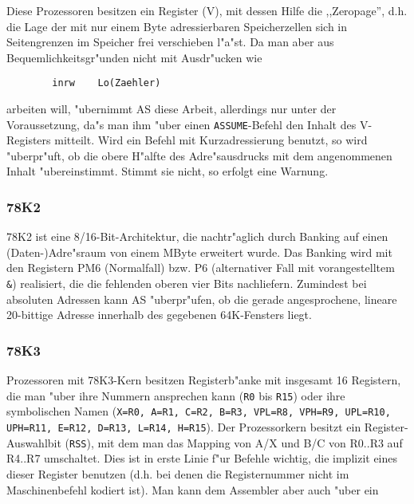 \documentclass[12pt,a4paper,twoside]{report}
\newcommand{\tty}[1]{{\tt #1}}
\begin{document}
Diese Prozessoren besitzen ein Register (V), mit dessen Hilfe die
,,Zeropage'', d.h. die Lage der mit nur einem Byte adressierbaren
Speicherzellen sich in Seitengrenzen im Speicher frei verschieben l"a"st.
Da man aber aus Bequemlichkeitsgr"unden nicht mit Ausdr"ucken wie
\begin{verbatim}
        inrw    Lo(Zaehler)
\end{verbatim}
arbeiten will, "ubernimmt AS diese Arbeit, allerdings nur unter der
Voraussetzung, da"s man ihm "uber einen \tty{ASSUME}-Befehl den
Inhalt des V-Registers mitteilt.  Wird ein Befehl mit Kurzadressierung
benutzt, so wird "uberpr"uft, ob die obere H"alfte des Adre"sausdrucks
mit dem angenommenen Inhalt "ubereinstimmt.  Stimmt sie nicht, so erfolgt
eine Warnung.


\subsubsection{78K2}

78K2 ist eine 8/16-Bit-Architektur, die nachtr"aglich durch Banking auf
einen (Daten-)Adre"sraum von einem MByte erweitert wurde.  Das Banking
wird mit den Registern PM6 (Normalfall) bzw. P6 (alternativer Fall mit
vorangestelltem \verb!&!) realisiert, die die fehlenden oberen vier Bits
nachliefern.  Zumindest bei absoluten Adressen kann AS "uberpr"ufen, ob
die gerade angesprochene, lineare 20-bittige Adresse innerhalb des
gegebenen 64K-Fensters liegt.


\subsubsection{78K3}

Prozessoren mit 78K3-Kern besitzen Registerb"anke mit insgesamt 16 Registern,
die man "uber ihre Nummern ansprechen kann (\tty{R0} bis \tty{R15}) oder ihre symbolischen
Namen (\tty{X=R0, A=R1, C=R2, B=R3, VPL=R8, VPH=R9, UPL=R10, UPH=R11, E=R12,
D=R13, L=R14, H=R15}).  Der Prozessorkern besitzt ein Register-Auswahlbit
(\tty{RSS}), mit dem man das Mapping von A/X und B/C von R0..R3 auf R4..R7
umschaltet.  Dies ist in erste Linie f"ur Befehle wichtig, die implizit eines
dieser Register benutzen (d.h. bei denen die Registernummer nicht im Maschinenbefehl
kodiert ist).  Man kann dem Assembler aber auch "uber ein
\end{document}
